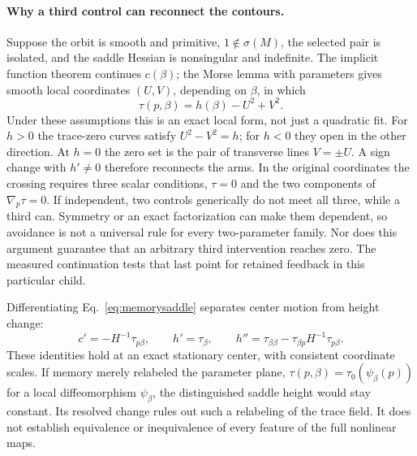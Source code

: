 \documentclass[11pt,letterpaper]{article}
\begin{document}
\paragraph{Why a third control can reconnect the contours.} Suppose the orbit is smooth and primitive,
$1\notin\sigma(M)$, the selected pair is isolated, and the saddle Hessian is nonsingular and indefinite. The
implicit function theorem continues $c(\beta)$; the Morse lemma with parameters
\cite[Appendix B, Proposition 16]{plantinga2007certified} gives smooth local coordinates $(U,V)$, depending on
$\beta$, in which
\begin{equation}
 \tau(p,\beta)=h(\beta)-U^2+V^2.
 \label{eq:memorymorse}
\end{equation}
Under these assumptions this is an exact local form, not just a quadratic fit. For $h>0$ the trace-zero curves
satisfy $U^2-V^2=h$; for $h<0$ they open in the other direction. At $h=0$ the zero set is the pair of transverse
lines $V=\pm U$. A sign change with $h'\ne0$ therefore reconnects the arms. In the original coordinates the
crossing requires three scalar conditions, $\tau=0$ and the two components of $\nabla_p\tau=0$. If independent,
two controls generically do not meet all three, while a third can. Symmetry or an exact factorization can make
them dependent, so avoidance is not a universal rule for every two-parameter family. Nor does this argument
guarantee that an arbitrary third intervention reaches zero. The measured continuation tests that last point for
retained feedback in this particular child.

Differentiating Eq.~\eqref{eq:memorysaddle} separates center motion from height change:
\begin{equation}
 c'=-H^{-1}\tau_{p\beta},\qquad h'=\tau_\beta,\qquad
 h''=\tau_{\beta\beta}-\tau_{\beta p}H^{-1}\tau_{p\beta}.
 \label{eq:memoryheightderivative}
\end{equation}
These identities hold at an exact stationary center, with consistent coordinate scales. If memory merely
relabeled the parameter plane, $\tau(p,\beta)=\tau_0(\psi_\beta(p))$ for a local diffeomorphism
$\psi_\beta$, the distinguished saddle height would stay constant. Its resolved change rules out such a
relabeling of the trace field. It does not establish equivalence or inequivalence of every feature of the full
nonlinear maps.
\end{document}
